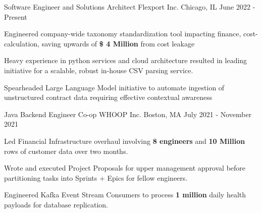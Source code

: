 

\begin{cventries}

\cventry
    {Software Engineer and Solutions Architect} %
    {Flexport Inc.} %
    {Chicago, IL} %
    {June 2022 - Present} %
    {
      \begin{cvitems} %
        \item {Engineered company-wide taxonomy standardization tool impacting finance, cost-calculation, saving upwards of \textbf{\$ 4 Million} from cost leakage }
        \item { Heavy experience in python services and cloud architecture resulted in leading initiative for a scalable, robust in-house CSV parsing service. }
        \item{Spearheaded Large Language Model initiative to automate ingestion of unstructured contract data requiring effective contextual awareness}
      \end{cvitems}
    }

  \cventry
    {Java Backend Engineer Co-op} %
    {WHOOP Inc.} %
    {Boston, MA} %
    {July 2021 - November 2021} %
    {
      \begin{cvitems} %
        \item {Led Financial Infrastructure overhaul involving \textbf{8 engineers} and \textbf{10 Million} rows of customer data over two months.}
        \item { Wrote and executed Project Proposals for upper management approval before partitioning tasks into Sprints + Epics for fellow engineers.}
        \item {Engineered Kafka Event Stream Consumers to process \textbf{1 million} daily health payloads for database replication.}
      \end{cvitems}
    }
    

\end{cventries}
